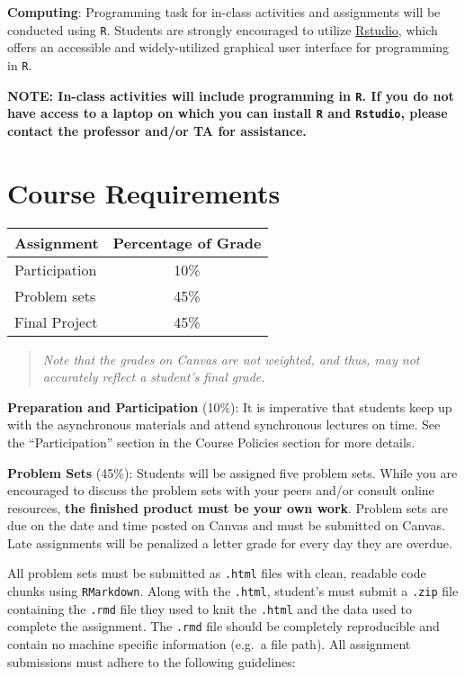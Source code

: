 \documentclass[
  12pt,
]{article}
\begin{document}
\textbf{Computing}: Programming task for in-class activities and
assignments will be conducted using \texttt{R}. Students are strongly
encouraged to utilize
\href{https://www.rstudio.com/products/rstudio/download/}{Rstudio},
which offers an accessible and widely-utilized graphical user interface
for programming in \texttt{R}.

\textbf{NOTE: In-class activities will include programming in
\texttt{R}. If you do not have access to a laptop on which you can
install \texttt{R} and \texttt{Rstudio}, please contact the professor
and/or TA for assistance.}

\hypertarget{course-requirements}{%
\section{Course Requirements}\label{course-requirements}}

\begin{longtable}[]{@{}lc@{}}
\toprule
\textbf{Assignment} & \textbf{Percentage of Grade}\tabularnewline
\midrule
\endhead
Participation & 10\%\tabularnewline
Problem sets & 45\%\tabularnewline
Final Project & 45\%\tabularnewline
\bottomrule
\end{longtable}

\begin{quote}
\emph{Note that the grades on Canvas are not weighted, and thus, may not
accurately reflect a student's final grade.}
\end{quote}

\textbf{Preparation and Participation} (10\%): It is imperative that
students keep up with the asynchronous materials and attend synchronous
lectures on time. See the ``Participation'' section in the Course
Policies section for more details.

\textbf{Problem Sets} (45\%): Students will be assigned five problem
sets. While you are encouraged to discuss the problem sets with your
peers and/or consult online resources, \textbf{the finished product must
be your own work}. Problem sets are due on the date and time posted on
Canvas and must be submitted on Canvas. Late assignments will be
penalized a letter grade for every day they are overdue.

All problem sets must be submitted as \texttt{.html} files with clean,
readable code chunks using \texttt{RMarkdown}. Along with the
\texttt{.html}, student's must submit a \texttt{.zip} file containing
the \texttt{.rmd} file they used to knit the \texttt{.html} and the data
used to complete the assignment. The \texttt{.rmd} file should be
completely reproducible and contain no machine specific information
(e.g.~a file path). All assignment submissions must adhere to the
following guidelines:
\end{document}
